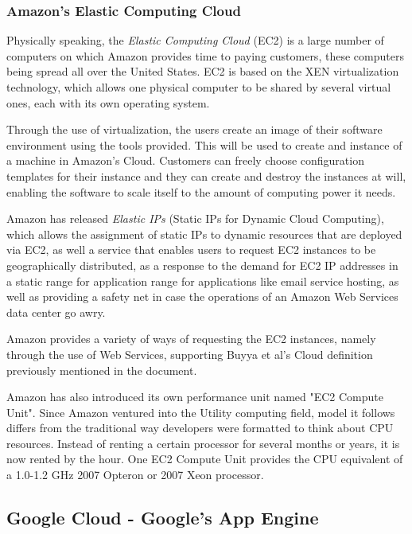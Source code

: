 \subsubsection{Amazon's Elastic Computing Cloud}\label{amazon-ec}

Physically speaking, the \textit{Elastic Computing Cloud} (EC2) is a large number of computers on which Amazon provides time to paying customers, these computers being spread all over the United States. EC2 is based on the XEN virtualization technology, which allows one physical computer to be shared by several virtual ones, each with its own operating system.

Through the use of virtualization, the users create an image of their software environment using the tools provided. This will be used to create and instance of a machine in Amazon's Cloud. Customers can freely choose configuration templates for their instance and they can create and destroy the instances at will, enabling the software to scale itself to the amount of computing power it needs.\cite{grids-and-clouds, hazel}

Amazon has released \textit{Elastic IPs} (Static IPs for Dynamic Cloud Computing), which allows the assignment of static IPs to dynamic resources that are deployed via EC2, as well a service that enables users to request EC2 instances to be geographically distributed, as a response to the demand for EC2 IP addresses in a static range for application range for applications like email service hosting, as well as providing a safety net in case the operations of an Amazon Web Services data center go awry. 

Amazon provides a variety of ways of requesting the EC2 instances, namely through the use of Web Services, supporting Buyya et al's Cloud definition previously mentioned in the document.

Amazon has also introduced its own performance unit named "EC2 Compute Unit". Since Amazon ventured into the Utility computing field, model it follows differs from the traditional way developers were formatted to think about CPU resources. Instead of renting a certain processor for several months or years, it is now rented by the hour. One EC2 Compute Unit provides the CPU equivalent of a 1.0-1.2 GHz 2007 Opteron or 2007 Xeon processor.\cite{amazon-aws}

\subsection{Google Cloud - Google's App Engine}\label{googleapps}


